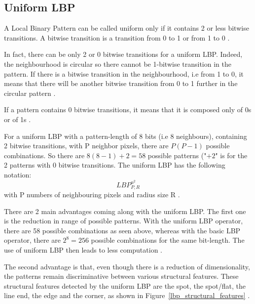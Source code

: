 \subsection{Uniform LBP}

\vspace{\baselineskip}
\noindent A Local Binary Pattern can be called uniform only if it contains 2 or less bitwise transitions. A bitwise transition is a transition from 0 to 1 or from 1 to 0 \cite{GAN08}. 
\newline

\noindent In fact, there can be only 2 or 0 bitwise transitions for a uniform LBP. Indeed, the neighbourhood is circular so there cannot be 1-bitwise transition in the pattern. If there is a bitwise transition in the neighbourhood, i.e from 1 to 0, it means that there will be another bitwise transition from 0 to 1 further in the circular pattern \cite{GAN08}.
\newline

\noindent If a pattern contains 0 bitwise transitions, it means that it is composed only of 0s or of 1s \cite{GAN08}.
\newline

\noindent For a uniform LBP with a pattern-length of 8 bits (i.e 8 neighbours), containing 2 bitwise transitions, with P neighbor pixels, there are $ P(P - 1) $ possible combinations. So there are $ 8(8 - 1) + 2 =58 $ possible patterns ("$ + 2 $" is for the 2 patterns with 0 bitwise transitions. The uniform LBP has the following notation: \[ LBP_{P,R}^{u^2} \] with P numbers of neighbouring pixels and radius size R \cite{GAN08}.
\newline

\noindent There are 2 main advantages coming along with the uniform LBP. The first one is the reduction in range of possible patterns. With the uniform LBP operator, there are 58 possible combinations as seen above, whereas with the basic LBP operator, there are $ 2^8 = 256 $ possible combinations for the same bit-length. The use of uniform LBP then leads to less computation \cite{GAN08}.
\newline

\noindent The second advantage is that, even though there is a reduction of dimensionality, the patterns remain discriminative between various structural features. These structural features detected by the uniform LBP are the spot, the spot/flat, the line end, the edge and the corner, as shown in Figure~\ref{lbp_structural_features}  \cite{GAN08}.
\newline

